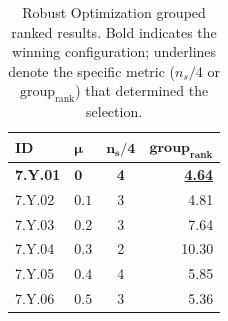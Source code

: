 \begin{table}[!t]
\centering
\footnotesize
\caption{Robust Optimization grouped ranked results. Bold indicates the winning configuration; underlines denote the specific metric ($n_s/4$ or $\text{group}_{\text{rank}}$) that determined the selection.}
\label{tab:robust_grouped_ranked}
\begin{tabular}{@{}llcr@{}}
\hline
    \textbf{ID} & $\bm{\mu}$ & $\bm{n_s/4}$ & $\bm{\text{group}_{\text{rank}}}$ \\
\hline
    \textbf{7.Y.01} & $\bm{0}$ & \textbf{4} & \textbf{\underline{4.64}} \\
    7.Y.02 & $0.1$ & 3 & 4.81 \\
    7.Y.03 & $0.2$ & 3 & 7.64 \\
    7.Y.04 & $0.3$ & 2 & 10.30 \\
    7.Y.05 & $0.4$ & 4 & 5.85 \\
    7.Y.06 & $0.5$ & 3 & 5.36 \\
\hline
\end{tabular}
\end{table}